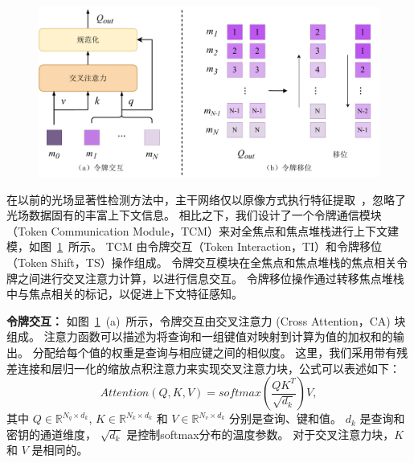 %
%
%
%
%
\begin{figure}[!ht]
	\centering
	\includegraphics[width=0.95\linewidth]{figures/chapter3/token-interaction.drawio}
	\label{cpt3_fig1:token_interaction}
\end{figure}
%
%
%
%
在以前的光场显著性检测方法中，主干网络仅以原像方式执行特征提取~\cite{piao2020exploit, liu2021light}，忽略了光场数据固有的丰富上下文信息。 相比之下，我们设计了一个令牌通信模块（Token Communication Module，TCM）来对全焦点和焦点堆栈进行上下文建模，如图~\ref{cpt3_fig1:token_interaction}~所示。
TCM 由令牌交互（Token Interaction，TI）和令牌移位（Token Shift，TS）操作组成。 
令牌交互模块在全焦点和焦点堆栈的焦点相关令牌之间进行交叉注意力计算，以进行信息交互。 
令牌移位操作通过转移焦点堆栈中与焦点相关的标记，以促进上下文特征感知。 
%
%
%
%
%
\par
\textbf{令牌交互：}
如图~\ref{cpt3_fig1:token_interaction}~(a)~所示，令牌交互由交叉注意力 (Cross Attention，CA) 块组成。 
注意力函数可以描述为将查询和一组键值对映射到计算为值的加权和的输出。 
分配给每个值的权重是查询与相应键之间的相似度。 
这里，我们采用带有残差连接和层归一化的缩放点积注意力来实现交叉注意力块，公式可以表述如下：
%
%
%
\begin{equation}
	Attention(Q,K,V) = softmax \left ( \frac{QK^{T}}{\sqrt{d_{k}}} \right ) V,
\end{equation}
%
%
其中
$ Q \in \mathbb{R}^{N_{q}\times d_{k}}  $,
$ K \in \mathbb{R}^{N_{k}\times d_{k}}  $ 和
$ V \in \mathbb{R}^{N_{v}\times d_{k}}  $ 
分别是查询、键和值。 
$ d_{k} $ 是查询和密钥的通道维度，
$ \sqrt{d_{k}} $ 是控制softmax分布的温度参数。 
对于交叉注意力块，$K$ 和 $V$ 是相同的。 
%
%
%
%
%
\par
